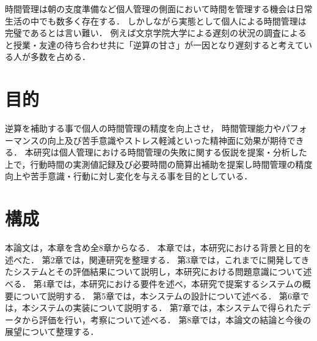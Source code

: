 時間管理は朝の支度準備など個人管理の側面において時間を管理する機会は日常生活の中でも数多く存在する．
しかしながら実態として個人による時間管理は完璧であるとは言い難い．
例えば文京学院大学による遅刻の状況の調査によると授業・友達の待ち合わせ共に「逆算の甘さ」が一因となり遅刻すると考えている人が多数を占める\cite{bunkyo}．

\section{目的}
逆算を補助する事で個人の時間管理の精度を向上させ，
時間管理能力やパフォーマンスの向上及び苦手意識やストレス軽減といった精神面に効果が期待できる．
本研究は個人管理における時間管理の失敗に関する仮説を提案・分析した上で，行動時間の実測値記録及び必要時間の簡算出補助を提案し時間管理の精度向上や苦手意識・行動に対し変化を与える事を目的としている．

\section{構成}
本論文は，本章を含め全8章からなる．
本章では，本研究における背景と目的を述べた．
第2章では，関連研究を整理する．
第3章では，これまでに開発してきたシステムとその評価結果について説明し，本研究における問題意識について述べる．
第4章では，本研究における要件を述べ，本研究で提案するシステムの概要について説明する．
第5章では，本システムの設計について述べる．
第6章では，本システムの実装について説明する．
第7章では，本システムで得られたデータから評価を行い，考察について述べる．
第8章では，本論文の結論と今後の展望について整理する．
